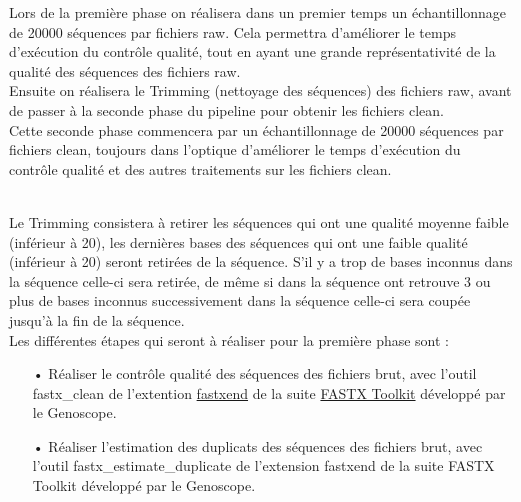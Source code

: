 \begin{minipage}{0.45\textwidth}

    Lors de la première phase on réalisera dans un premier temps un échantillonnage de 20000 séquences par fichiers \og raw\fg{}. Cela permettra d'améliorer le temps d'exécution du contrôle qualité, tout en ayant une grande représentativité de la qualité des séquences des fichiers \og raw\fg{}.\\

    Ensuite on réalisera le \og Trimming\fg{} (nettoyage des séquences) des fichiers \og raw\fg{}, avant de passer à la seconde phase du pipeline pour obtenir les fichiers \og clean\fg{}.\\

    Cette seconde phase commencera par un échantillonnage de 20000 séquences par fichiers \og clean\fg{}, toujours dans l'optique d'améliorer le temps d'exécution du contrôle qualité et des autres traitements sur les fichiers \og clean\fg{}.


\end{minipage}\\[0.5cm]

Le Trimming consistera à retirer les séquences qui ont une qualité moyenne faible (inférieur à 20), les dernières bases des séquences qui ont une faible qualité (inférieur à 20) seront retirées de la séquence. S'il y a trop de bases inconnus dans la séquence celle-ci sera retirée, de même si dans la séquence ont retrouve 3 ou plus de bases inconnus successivement dans la séquence celle-ci sera coupée jusqu'à la fin de la séquence.\\


Les différentes étapes qui seront à réaliser pour la première phase sont :\\
\begin{itemize}
    \item[•] Réaliser le contrôle qualité des séquences des fichiers brut, avec l'outil fastx\_clean de l'extention \href{https://github.com/institut-de-genomique/fastxtend}{fastxend} de la suite \href{http://hannonlab.cshl.edu/fastx_toolkit/}{FASTX Toolkit} développé par le Genoscope.
    \item[•] Réaliser l'estimation des duplicats des séquences des fichiers brut, avec l'outil fastx\_estimate\_duplicate de l'extension fastxend de la suite FASTX Toolkit développé par le Genoscope.\\
\end{itemize}

